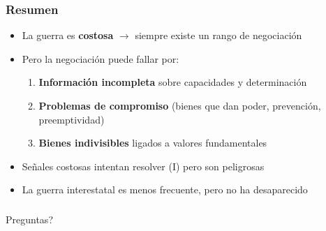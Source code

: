 
\begin{frame}
\frametitle{Resumen}
\centering

\begin{itemize}
  \item La guerra es \textbf{costosa} $\rightarrow$ siempre existe un rango de negociación
  \item Pero la negociación puede fallar por:
  \begin{enumerate}
    \item \textbf{Información incompleta} sobre capacidades y determinación
    \item \textbf{Problemas de compromiso} (bienes que dan poder, prevención, preemptividad)
    \item \textbf{Bienes indivisibles} ligados a valores fundamentales
  \end{enumerate}
  \vspace{8pt}
  \item<2-> Señales costosas intentan resolver (I) pero son peligrosas
  \item<3-> La guerra interestatal es menos frecuente, pero no ha desaparecido
\end{itemize}

\end{frame}

\begin{frame}
\frametitle{}
\centering

Preguntas?

\end{frame}
\note{}
